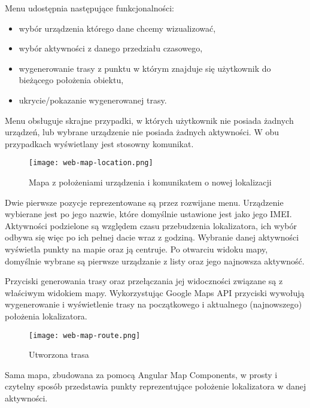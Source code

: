 \documentclass[eng,printmode]{mgr}
\begin{document}
Menu udostępnia następujące funkcjonalności:
\begin{itemize}
\item wybór urządzenia którego dane chcemy wizualizować,
\item wybór aktywności z danego przedziału czasowego,
\item wygenerowanie trasy z punktu w którym znajduje się użytkownik do bieżącego położenia obiektu,
\item ukrycie/pokazanie wygenerowanej trasy.
\end{itemize}
Menu obsługuje skrajne przypadki, w których użytkownik nie posiada żadnych urządzeń, lub wybrane urządzenie nie posiada żadnych aktywności. W obu przypadkach wyświetlany jest stosowny komunikat.

\begin{figure}[ht]
\centering
\texttt{[image: web-map-location.png]}
\caption{Mapa z położeniami urządzenia i komunikatem o nowej lokalizacji}
\end{figure}

Dwie pierwsze pozycje reprezentowane są przez rozwijane menu. Urządzenie wybierane jest po jego nazwie, które domyślnie ustawione jest jako jego IMEI. Aktywności podzielone są względem czasu przebudzenia lokalizatora, ich wybór odbywa się więc po ich pełnej dacie wraz z godziną. Wybranie danej aktywności wyświetla punkty na mapie oraz ją centruje. Po otwarciu widoku mapy, domyślnie wybrane są pierwsze urządzanie z listy oraz jego najnowsza aktywność.

Przyciski generowania trasy oraz przełączania jej widoczności związane są z właściwym widokiem mapy. Wykorzystując Google Maps API przyciski wywołują wygenerowanie i wyświetlenie trasy na początkowego i aktualnego (najnowszego) położenia lokalizatora.

\begin{figure}[ht]
\centering
\texttt{[image: web-map-route.png]}
\caption{Utworzona trasa}
\end{figure}

Sama mapa, zbudowana za pomocą Angular Map Components, w prosty i czytelny sposób przedstawia punkty reprezentujące położenie lokalizatora w danej aktywności.
\end{document}
